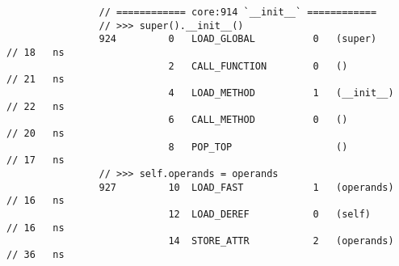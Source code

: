 \begin{code}
\begin{verbatim}
                // ============ core:914 `__init__` ============
                // >>> super().__init__()
                924         0   LOAD_GLOBAL          0   (super)                            // 18   ns
                            2   CALL_FUNCTION        0   ()                                 // 21   ns
                            4   LOAD_METHOD          1   (__init__)                         // 22   ns
                            6   CALL_METHOD          0   ()                                 // 20   ns
                            8   POP_TOP                  ()                                 // 17   ns
                // >>> self.operands = operands
                927         10  LOAD_FAST            1   (operands)                         // 16   ns
                            12  LOAD_DEREF           0   (self)                             // 16   ns
                            14  STORE_ATTR           2   (operands)                         // 36   ns


\end{verbatim}
\end{code}
